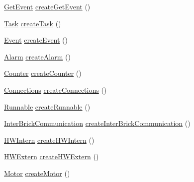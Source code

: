 \begin{DoxyCompactItemize}
\hyperlink{interfaceshootingmachineemfmodel_1_1_get_event}{Get\-Event} \hyperlink{interfaceshootingmachineemfmodel_1_1_shootingmachineemfmodel_factory_acf7129989729570fa6bbc06cb6d84d38}{create\-Get\-Event} ()
\item 
\hyperlink{interfaceshootingmachineemfmodel_1_1_task}{Task} \hyperlink{interfaceshootingmachineemfmodel_1_1_shootingmachineemfmodel_factory_a05347eb1d82d664c754030f34b05fbc3}{create\-Task} ()
\item 
\hyperlink{interfaceshootingmachineemfmodel_1_1_event}{Event} \hyperlink{interfaceshootingmachineemfmodel_1_1_shootingmachineemfmodel_factory_a679b192f9b46c90cb45b6b47bf6c9fd4}{create\-Event} ()
\item 
\hyperlink{interfaceshootingmachineemfmodel_1_1_alarm}{Alarm} \hyperlink{interfaceshootingmachineemfmodel_1_1_shootingmachineemfmodel_factory_a27ac54cec07cd65634d8234899a2cc09}{create\-Alarm} ()
\item 
\hyperlink{interfaceshootingmachineemfmodel_1_1_counter}{Counter} \hyperlink{interfaceshootingmachineemfmodel_1_1_shootingmachineemfmodel_factory_a4b04d6779162bf6f0cf9471955218341}{create\-Counter} ()
\item 
\hyperlink{interfaceshootingmachineemfmodel_1_1_connections}{Connections} \hyperlink{interfaceshootingmachineemfmodel_1_1_shootingmachineemfmodel_factory_af7cfb669b11d24bf113df8809e0bc619}{create\-Connections} ()
\item 
\hyperlink{interfaceshootingmachineemfmodel_1_1_runnable}{Runnable} \hyperlink{interfaceshootingmachineemfmodel_1_1_shootingmachineemfmodel_factory_a67871c6e90ca9f5890575bfff9b718dd}{create\-Runnable} ()
\item 
\hyperlink{interfaceshootingmachineemfmodel_1_1_inter_brick_communication}{Inter\-Brick\-Communication} \hyperlink{interfaceshootingmachineemfmodel_1_1_shootingmachineemfmodel_factory_aef6ae32d0ed354f9ec4aa881631b8f33}{create\-Inter\-Brick\-Communication} ()
\item 
\hyperlink{interfaceshootingmachineemfmodel_1_1_h_w_intern}{H\-W\-Intern} \hyperlink{interfaceshootingmachineemfmodel_1_1_shootingmachineemfmodel_factory_abd443ccfa402b8790d94300d9848b0ad}{create\-H\-W\-Intern} ()
\item 
\hyperlink{interfaceshootingmachineemfmodel_1_1_h_w_extern}{H\-W\-Extern} \hyperlink{interfaceshootingmachineemfmodel_1_1_shootingmachineemfmodel_factory_a9378b3fd217e8a22afd595cd1fde9e43}{create\-H\-W\-Extern} ()
\item 
\hyperlink{interfaceshootingmachineemfmodel_1_1_motor}{Motor} \hyperlink{interfaceshootingmachineemfmodel_1_1_shootingmachineemfmodel_factory_ae6d84cafbf868de4eac56ffdd330748d}{create\-Motor} ()

\end{DoxyCompactItemize}
